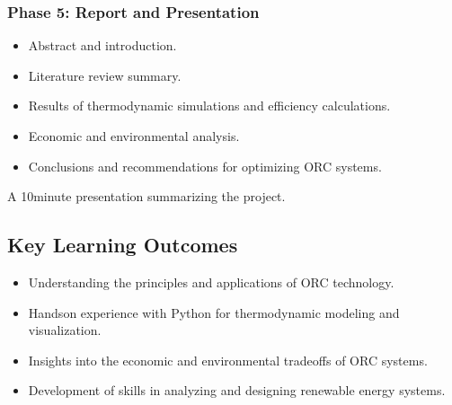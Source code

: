 \documentclass[letterpaper,10pt,english]{jupyterBook}
\begin{document}
\subsubsection{Phase 5: Report and Presentation}
\label{\detokenize{ProjectInstructions:id4}}
\sphinxAtStartPar
{}
\begin{itemize}
\item {} 
\sphinxAtStartPar
Abstract and introduction.

\item {} 
\sphinxAtStartPar
Literature review summary.

\item {} 
\sphinxAtStartPar
Results of thermodynamic simulations and efficiency calculations.

\item {} 
\sphinxAtStartPar
Economic and environmental analysis.

\item {} 
\sphinxAtStartPar
Conclusions and recommendations for optimizing ORC systems.

\end{itemize}

\sphinxAtStartPar
{} A 10\sphinxhyphen{}minute presentation summarizing the project.


\subsection{Key Learning Outcomes}
\label{\detokenize{ProjectInstructions:id5}}\begin{itemize}
\item {} 
\sphinxAtStartPar
Understanding the principles and applications of ORC technology.

\item {} 
\sphinxAtStartPar
Hands\sphinxhyphen{}on experience with Python for thermodynamic modeling and
visualization.

\item {} 
\sphinxAtStartPar
Insights into the economic and environmental trade\sphinxhyphen{}offs of ORC
systems.

\item {} 
\sphinxAtStartPar
Development of skills in analyzing and designing renewable energy
systems.

\end{itemize}
\end{document}
